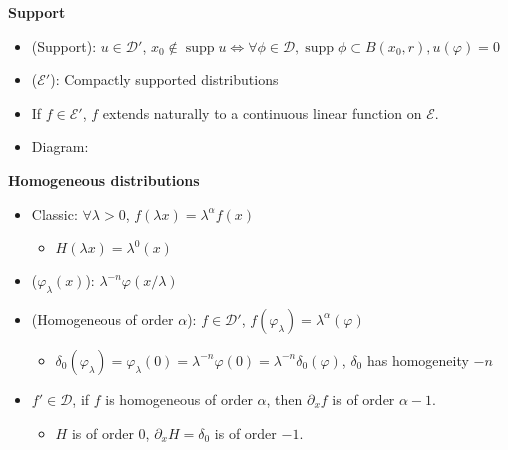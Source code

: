 \documentclass[a4paper, 11pt]{article}
\theoremstyle{definition}
\theoremstyle{remark}
\newcommand{\cD}{\mathcal{D}}
\newcommand{\cE}{\mathcal{E}}
\newcommand{\supp}{\mathop{\mathrm{supp}}}
\begin{document}
\textbf{Support}
\begin{itemize}
    \item (Support): $u\in \cD'$, $x_0\notin \supp u \Leftrightarrow \forall \phi \in \cD, \supp \phi \subset B(x_0,r), u(\varphi) = 0$
    \item ($\cE'$): Compactly supported distributions
    \item If $f\in \cE'$, $f$ extends naturally to a continuous linear function on $\cE$.
    \item Diagram:  
\end{itemize}

\textbf{Homogeneous distributions}
\begin{itemize}
    \item Classic: $\forall \lambda >0$, $f(\lambda x) = \lambda^\alpha f(x)$
    \begin{itemize}
        \item $H(\lambda x) = \lambda^0(x)$
    \end{itemize}
    \item ($\varphi_\lambda (x)$): $\lambda^{-n}\varphi(x/\lambda)$
    \item (Homogeneous of order $\alpha$): $f\in \cD'$, $f(\varphi_\lambda) = \lambda^\alpha(\varphi)$
    \begin{itemize}
        \item $\delta_0 (\varphi_\lambda) = \varphi_\lambda(0) = \lambda^{-n}\varphi(0) = \lambda^{-n}\delta_0(\varphi)$, $\delta_0$ has homogeneity $-n$
    \end{itemize}
    \item $f'\in \cD$, if $f$ is homogeneous of order $\alpha$, then $\partial_x f$ is of order $\alpha-1$.
    \begin{itemize}
        \item $H$ is of order $0$, $\partial_x H = \delta_0$ is of order $-1$. 
    \end{itemize}
\end{itemize}
\end{document}
